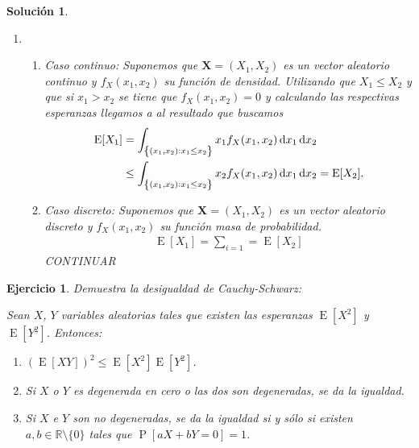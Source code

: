 \documentclass[
  a4paper,
  spanish,
  12pt,
]{scrartcl}
\theoremstyle{ejercicio-style}
\newtheorem{ejer}{Ejercicio}
\theoremstyle{remark-style}
\newtheorem*{sol}{Solución}
\begin{document}
\begin{sol}
\begin{enumerate}
    En el caso discreto, 
  
    \item
      \begin{enumerate}
        \item Caso continuo: Suponemos que \(\symbf{X} = (X_1, X_2)\) es un vector aleatorio continuo y \(f_X(x_1, x_2)\) su función de densidad. 
        Utilizando que \(X_1 \leq X_2\) y que si \(x_1 > x_2\) se tiene que \(f_X(x_1, x_2) = 0\) y calculando las respectivas esperanzas llegamos a al resultado que buscamos
          \begin{align*}
            \operatorname{E}[X_1] &= \int_{\left\{(x_1, x_2) : x_1 \leq x_2\right\}} x_1 f_X (x_1, x_2) \dif x_1 \dif x_2 \\
              &\leq \int_{\left\{(x_1, x_2) : x_1 \leq x_2\right\}} x_2 f_X (x_1, x_2) \dif x_1 \dif x_2 = \operatorname{E}[X_2].
          \end{align*}
          
        \item Caso discreto: Suponemos que \(\symbf{X} = (X_1, X_2)\) es un vector aleatorio discreto y \(f_X(x_1, x_2)\) su función masa de probabilidad.
          \begin{align*}
            \operatorname{E}[X_1] = \sum_{i=1} = \operatorname{E}[X_2]
          \end{align*}
          CONTINUAR
          
      \end{enumerate}
  \end{enumerate}
\end{sol}

\begin{ejer}
  Demuestra la desigualdad de Cauchy-Schwarz: \begin{displayquote}
    Sean \(X\), \(Y\) variables aleatorias tales que existen las esperanzas \(\operatorname{E}[X^2]\) y \(\operatorname{E}[Y^2]\). Entonces:
    \begin{enumerate}
      \item \(\left(\operatorname{E}[XY]\right)^2 \leq \operatorname{E}[X^2] \operatorname{E}[Y^2]\).
      \item Si \(X\) o \(Y\) es degenerada en cero o las dos son degeneradas, se da la igualdad.
      \item Si \(X\) e \(Y\) son no degeneradas, se da la igualdad si y sólo si existen \(a,b \in \mathbb{R}\setminus\{0\}\) tales que \(\operatorname{P}[aX+bY=0] = 1\).
    \end{enumerate}
  \end{displayquote}
\end{ejer}
\end{document}

